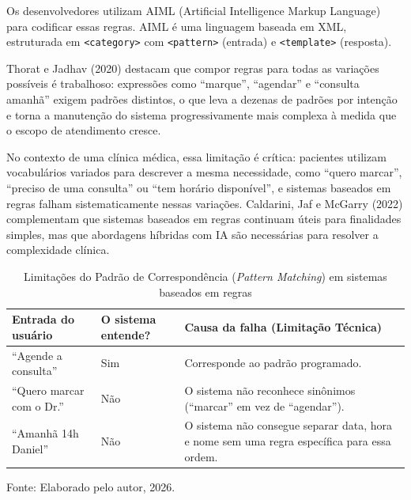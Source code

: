 \documentclass[12pt,a4paper]{extarticle}
\begin{document}
Os desenvolvedores utilizam AIML (Artificial Intelligence Markup Language) para codificar essas regras. AIML é uma linguagem baseada em XML, estruturada em \texttt{<category>} com \texttt{<pattern>} (entrada) e \texttt{<template>} (resposta).

Thorat e Jadhav (2020) destacam que compor regras para todas as variações possíveis é trabalhoso: expressões como ``marque'', ``agendar'' e ``consulta amanhã'' exigem padrões distintos, o que leva a dezenas de padrões por intenção e torna a manutenção do sistema progressivamente mais complexa à medida que o escopo de atendimento cresce.

No contexto de uma clínica médica, essa limitação é crítica: pacientes utilizam vocabulários variados para descrever a mesma necessidade, como ``quero marcar'', ``preciso de uma consulta'' ou ``tem horário disponível'', e sistemas baseados em regras falham sistematicamente nessas variações. Caldarini, Jaf e McGarry (2022) complementam que sistemas baseados em regras continuam úteis para finalidades simples, mas que abordagens híbridas com IA são necessárias para resolver a complexidade clínica.

\begin{table}[H]
\centering
\caption{Limitações do Padrão de Correspondência (\textit{Pattern Matching}) em sistemas baseados em regras}
\label{tab:limitacoes-pattern-matching}
\begin{tabular}{p{2.8cm}p{2.2cm}p{7cm}}
\hline
\textbf{Entrada do usuário} & \textbf{O sistema entende?} & \textbf{Causa da falha (Limitação Técnica)} \\
\hline
``Agende a consulta'' & Sim & Corresponde ao padrão programado. \\
``Quero marcar com o Dr.'' & Não & O sistema não reconhece sinônimos (``marcar'' em vez de ``agendar''). \\
``Amanhã 14h Daniel'' & Não & O sistema não consegue separar data, hora e nome sem uma regra específica para essa ordem. \\
\hline
\end{tabular}
\vspace{0.3cm}

\footnotesize{Fonte: Elaborado pelo autor, 2026.}
\end{table}
\end{document}
